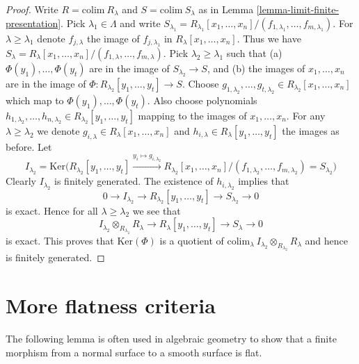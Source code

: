 \begin{proof}
Write $R = \text{colim}\ R_\lambda$ and $S = \text{colim}\ S_\lambda$
as in Lemma \ref{lemma-limit-finite-presentation}.
Pick $\lambda_1 \in \Lambda$ and write
$S_{\lambda_1} = R_{\lambda_1}[x_1, \ldots, x_n]/
(f_{1, \lambda_1}, \ldots, f_{m, \lambda_1})$. For $\lambda \geq \lambda_1$
denote $f_{j, \lambda}$ the image of $f_{j, \lambda_1}$ in
$R_\lambda[x_1, \ldots, x_n]$. Thus we have
$S_{\lambda} = R_{\lambda}[x_1, \ldots, x_n]/
(f_{1, \lambda}, \ldots, f_{m, \lambda})$. Pick $\lambda_2 \geq \lambda_1$
such that (a) $\Phi(y_1), \ldots, \Phi(y_t)$ are in the image of
$S_{\lambda_2} \to S$, and (b) the images of $x_1, \ldots, x_n$
are in the image of $\Phi : R_{\lambda_2}[y_1, \ldots, y_t] \to S$.
Choose $g_{1, \lambda_2}, \ldots, g_{t, \lambda_2} \in
R_{\lambda_2}[x_1, \ldots, x_n]$ which map to $\Phi(y_1), \ldots, \Phi(y_t)$.
Also choose polynomials
$h_{1, \lambda_2}, \ldots, h_{n, \lambda_2} \in R_{\lambda_2}[y_1, \ldots, y_t]$
mapping to the images of $x_1, \ldots, x_n$.
For any $\lambda \geq \lambda_2$ we denote
$g_{i, \lambda} \in R_{\lambda}[x_1, \ldots, x_n]$
and
$h_{i, \lambda} \in R_{\lambda}[y_1, \ldots, y_t]$
the images as before. Let
$$
I_{\lambda_2} = \text{Ker}\Big(
R_{\lambda_2}[y_1, \ldots, y_t]
\xrightarrow{y_i \mapsto g_{i, \lambda_2}}
R_{\lambda_2}[x_1, \ldots, x_n]/(f_{1, \lambda_2}, \ldots, f_{m, \lambda_2})
= S_{\lambda_2}
\Big)
$$
Clearly $I_{\lambda_2}$ is finitely generated. The existence of
$h_{i, \lambda_2}$ implies that
$$
0 \to I_{\lambda_2} \to R_{\lambda_2}[y_1, \ldots, y_t]
\to S_{\lambda_2} \to 0
$$
is exact. Hence for all $\lambda \geq \lambda_2$ we see
that
$$
I_{\lambda_2} \otimes_{R_{\lambda_2}} R_\lambda
\to
R_{\lambda}[y_1, \ldots, y_t]
\to S_{\lambda} \to 0
$$
is exact. This proves that $\text{Ker}(\Phi)$
is a quotient of
$\text{colim}_\lambda\ I_{\lambda_2} \otimes_{R_{\lambda_2}} R_\lambda$
and hence is finitely generated.
\end{proof}













\section{More flatness criteria}
\label{section-more-flatness-criteria}

\noindent
The following lemma is often used in algebraic geometry to show that a finite
morphism from a normal surface to a smooth surface is flat.

